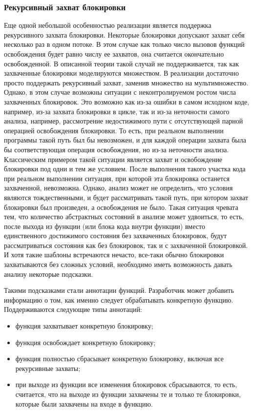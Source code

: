 \subsubsection{Рекурсивный захват блокировки}
Еще одной небольшой особенностью реализации является поддержка рекурсивного захвата блокировки. 
Некоторые блокировки допускают захват себя несколько раз в одном потоке.
В этом случае как только число вызовов функций освобождения будет равно числу ее захватов, она считается окончательно освобожденной.
В описанной теории такой случай не поддерживается, так как захваченные блокировки моделируются множеством.
В реализации достаточно просто поддержать рекурсивный захват, заменив множество на мультимножество.
Однако, в этом случае возможны ситуации с неконтролируемом ростом числа захваченных блокировок.
Это возможно как из-за ошибки в самом исходном коде, например, из-за захвата блокировки в цикле, так и из-за неточности самого анализа, например, рассмотрение недостижимого пути с отсутствующей парной операцией освобождения блокировки.
То есть, при реальном выполнении программы такой путь был бы невозможен, и для каждой операции захвата была бы соответствующая операция освобождения, но из-за неточности анализа.
Классическим примером такой ситуации является захват и освобождение блокировки под одни и тем же условием. 
После выполнения такого участка кода при реальном выполнении ситуация, при которой эта блокировка останется захваченной, невозможна.
Однако, анализ может не определить, что условия являются тождественными, и будет рассматривать такой путь, при котором захват блокировки был произведен, а освобождения не было.
Такая ситуация чревата тем, что количество абстрактных состояний в анализе может удвоиться, то есть, после выхода из функции (или блока кода внутри функции) вместо единственного достижимого состояния без захваченных блокировок, будут рассматриваться состояния как без блокировок, так и с захваченной блокировкой.
И хотя такие шаблоны встречаются нечасто, все-таки обычно блокировки захватываются без сложных условий, необходимо иметь возможность давать анализу некоторые подсказки.

Такими подсказками стали аннотации функций.
Разработчик может добавить информацию о том, как именно следует обрабатывать конкретную функцию.
Поддерживаются следующие типы аннотаций:
\begin{itemize}
\item функция захватывает конкретную блокировку;
\item функция освобождает конкретную блокировку;
\item функция полностью сбрасывает конкретную блокировку, включая все рекурсивные захваты;
\item при выходе из функции все изменения блокировок сбрасываются, то есть, считается, что на выходе из функции захвачены те и только те блокировки, которые были захвачены на входе в функцию.
\end{itemize}

